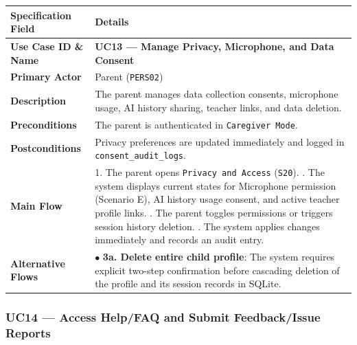 \noindent\begin{xltabular}{\textwidth}{|p{4.0cm}|X|}
\hline
\textbf{Specification Field} & \textbf{Details} \\ \hline
\endhead
\textbf{Use Case ID \& Name} & \textbf{UC13 — Manage Privacy, Microphone, and Data Consent} \\ \hline
\textbf{Primary Actor} & Parent (\texttt{PERS02}) \\ \hline
\textbf{Description} & The parent manages data collection consents, microphone usage, AI history sharing, teacher links, and data deletion. \\ \hline
\textbf{Preconditions} & The parent is authenticated in \texttt{Caregiver Mode}. \\ \hline
\textbf{Postconditions} & Privacy preferences are updated immediately and logged in \texttt{consent\_audit\_logs}. \\ \hline
\textbf{Main Flow} & 1. The parent opens \texttt{Privacy and Access} (\texttt{S20}). . The system displays current states for Microphone permission (Scenario E), AI history usage consent, and active teacher profile links. . The parent toggles permissions or triggers session history deletion. . The system applies changes immediately and records an audit entry. \\ \hline
\textbf{Alternative Flows} & $\bullet$ \textbf{3a. Delete entire child profile}: The system requires explicit two-step confirmation before cascading deletion of the profile and its session records in SQLite. \\ \hline
\end{xltabular}



\subsubsection{UC14 — Access Help/FAQ and Submit Feedback/Issue Reports}


